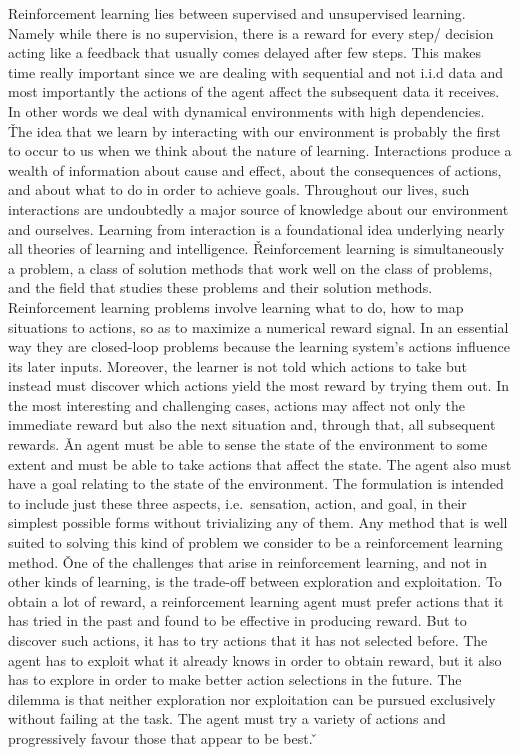 Reinforcement learning lies between supervised and unsupervised learning. Namely while there is no supervision, there
is a reward for every step/ decision acting like a feedback that usually comes delayed after few steps. This makes 
time really important since we are dealing with sequential and not i.i.d data and most importantly the actions of 
the agent affect the subsequent data it receives. In other words we deal with dynamical environments with high 
dependencies. \v

The idea that we learn by interacting with our environment is probably the first to occur to us when we think about 
the nature of learning. Interactions produce a wealth of information about cause and effect, about the consequences 
of actions, and about what to do in order to achieve goals. Throughout our lives, such interactions are undoubtedly 
a major source of knowledge about our environment and ourselves. Learning from interaction is a foundational idea 
underlying nearly all theories of learning and intelligence. \v

Reinforcement learning is simultaneously a problem, a class of solution methods that work well on the class of 
problems, and the field that studies these problems and their solution methods. Reinforcement learning problems 
involve learning what to do, how to map situations to actions, so as to maximize a numerical reward signal. In an 
essential way they are closed-loop problems because the learning system's actions influence its later inputs. 
Moreover, the learner is not told which actions to take but instead must discover which actions yield the most reward
by trying them out. In the most interesting and challenging cases, actions may affect not only the immediate reward 
but also the next situation and, through that, all subsequent rewards. \v

An agent must be able to sense the state of the environment to some extent and must be able to take actions that 
affect the state. The agent also must have a goal relating to the state of the environment. The formulation is 
intended to include just these three aspects, i.e.\ sensation, action, and goal, in their simplest possible forms
without trivializing any of them. Any method that is well suited to solving this kind of problem we consider to be a 
reinforcement learning method. \v

One of the challenges that arise in reinforcement learning, and not in other kinds of learning, is the trade-off 
between exploration and exploitation. To obtain a lot of reward, a reinforcement learning agent must prefer actions 
that it has tried in the past and found to be effective in producing reward. But to discover such actions, it has to
try actions that it has not selected before. The agent has to exploit what it already knows in order to obtain 
reward, but it also has to explore in order to make better action selections in the future. The dilemma is that 
neither exploration nor exploitation can be pursued exclusively without failing at the task. The agent must try a 
variety of actions and progressively favour those that appear to be best. \v

